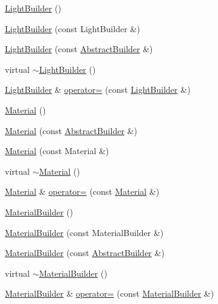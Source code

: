 \begin{DoxyCompactItemize}
\item 
\hyperlink{namespacejli_ab74bc38edd1ef6ffefa07b38a456dbf4}{Light\+Builder} ()
\item 
\hyperlink{namespacejli_a1db92fb58477bc8af86269d5cddc8685}{Light\+Builder} (const Light\+Builder \&)
\item 
\hyperlink{namespacejli_ae17e3ea054277db213f8262dc1f99949}{Light\+Builder} (const \hyperlink{classjli_1_1_abstract_builder}{Abstract\+Builder} \&)
\item 
virtual \hyperlink{namespacejli_a82b7beb28538effa192372c918468b1d}{$\sim$\+Light\+Builder} ()
\item 
\hyperlink{namespacejli_ab74bc38edd1ef6ffefa07b38a456dbf4}{Light\+Builder} \& \hyperlink{namespacejli_a45c9337ab49b0aacc1d8064bb940a7f7}{operator=} (const \hyperlink{namespacejli_ab74bc38edd1ef6ffefa07b38a456dbf4}{Light\+Builder} \&)
\item 
\hyperlink{namespacejli_a007372827318c5314719b1f97041f45c}{Material} ()
\item 
\hyperlink{namespacejli_a60fe526f7e6659ff8ae5f9cae7fb4c10}{Material} (const \hyperlink{classjli_1_1_abstract_builder}{Abstract\+Builder} \&)
\item 
\hyperlink{namespacejli_a2a281e85f9e15afd7c78051b8be24bb6}{Material} (const Material \&)
\item 
virtual \hyperlink{namespacejli_aeb5589dfed522420ea6a33236bde9a6b}{$\sim$\+Material} ()
\item 
\hyperlink{namespacejli_a007372827318c5314719b1f97041f45c}{Material} \& \hyperlink{namespacejli_ae9804996da5acf53e3b4b19831db4431}{operator=} (const \hyperlink{namespacejli_a007372827318c5314719b1f97041f45c}{Material} \&)
\item 
\hyperlink{namespacejli_abbc4482d10b2fab1145308318ec6ef4e}{Material\+Builder} ()
\item 
\hyperlink{namespacejli_ad3851357f4c908c0673c097c941828d6}{Material\+Builder} (const Material\+Builder \&)
\item 
\hyperlink{namespacejli_a8fb3dd20b46500cee7e4feb50df32824}{Material\+Builder} (const \hyperlink{classjli_1_1_abstract_builder}{Abstract\+Builder} \&)
\item 
virtual \hyperlink{namespacejli_aaf5dad0f1e903db02a6b170d69f35c37}{$\sim$\+Material\+Builder} ()
\item 
\hyperlink{namespacejli_abbc4482d10b2fab1145308318ec6ef4e}{Material\+Builder} \& \hyperlink{namespacejli_a786eb560b2617f0b8e9324d7d9cc9339}{operator=} (const \hyperlink{namespacejli_abbc4482d10b2fab1145308318ec6ef4e}{Material\+Builder} \&)

\end{DoxyCompactItemize}
